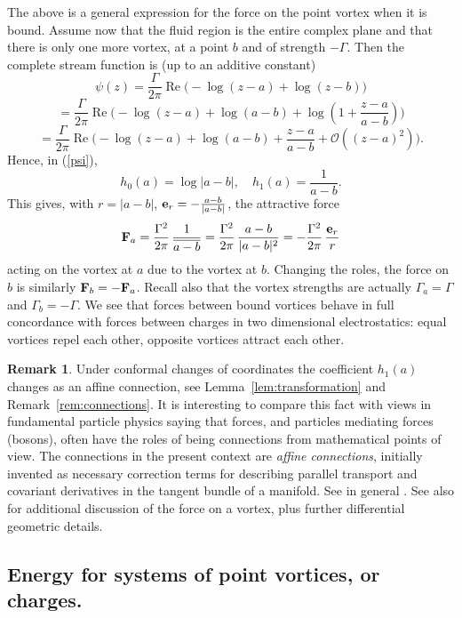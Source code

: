\documentclass[reqno,12pt]{article}
\theoremstyle{plain}
\theoremstyle{definition}
\newtheorem{remark}[defn]{Remark}
\numberwithin{equation}{section}
\numberwithin{figure}{section}
\DeclareMathOperator{\re}{Re}
\begin{document}
The above is a general expression for the force on the point vortex when it is bound. Assume now that the fluid region
is the entire complex plane and that there
is only one more vortex, at a point $b$ and of strength $-\Gamma$. Then the complete stream function
is (up to an additive constant)
$$
\psi(z)=\frac{\Gamma}{2\pi}\re\big(-\log  (z-a)+\log (z-b)\big)
$$
$$
=\frac{\Gamma}{2\pi}\re\big(-\log  (z-a)+\log (a-b)+\log(1+\frac{z-a}{a-b})\big)
$$
$$
=\frac{\Gamma}{2\pi}\re\big(-\log  (z-a)+\log (a-b)+\frac{z-a}{a-b}+ \mathcal{O}((z-a)^2)\big).
$$
Hence, in (\ref{psi}), 
$$
h_0(a)= \log |a-b|, \quad h_1(a)=\frac{1}{a-b}.
$$
This gives, with $r=|a-b|$, ${\bf e}_r=-\frac{a-b}{|a-b|}$, the attractive force
\begin{equation}\label{F}
{\bf F}_a=\frac{\Gamma^2}{2\pi}\,\frac{1}{\overline{a-b}}=\frac{\Gamma^2}{2\pi}\,\frac{a-b}{|a-b|^2}
=-\frac{\Gamma^2}{2\pi}\,\frac{{\bf e}_r}{r}
\end{equation}
acting on the vortex at $a$ due to the vortex at $b$. Changing the roles, the force on $b$ is 
similarly ${\bf F}_b=-{\bf F}_a$. Recall also that the vortex strengths are actually $\Gamma_a=\Gamma$
and $\Gamma_b=-\Gamma$. We see that forces between bound vortices
behave in full concordance with forces between charges in two dimensional electrostatics:
equal vortices repel each other, opposite vortices attract each other.

\begin{remark}\label{rem:affine connection}
Under conformal changes of coordinates the coefficient $h_1(a)$ changes as an affine connection,
see Lemma~\ref{lem:transformation} and Remark~\ref{rem:connections}.
It is interesting to compare this fact with views
in fundamental particle physics saying that forces, and particles mediating forces (bosons), 
often have the roles of being connections from mathematical points of view. The connections in the present context
are {\it affine connections}, initially invented as necessary correction terms 
for describing parallel transport and covariant derivatives in the tangent bundle of a manifold. See in general \cite{Frankel-2012}.
See also \cite{Grotta-Ragazzo-Barros-Viglioni-2017} for additional discussion of the force on a vortex, 
plus further differential geometric details. 
\end{remark} 


\subsection{Energy for systems of point vortices, or charges.}
\end{document}
